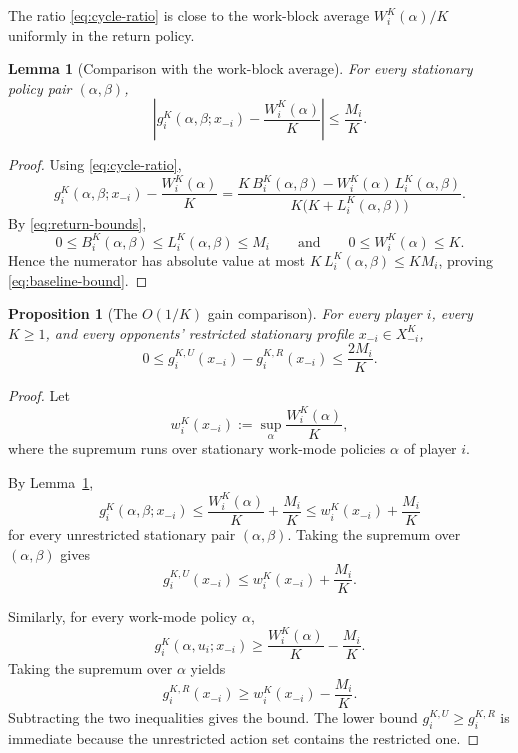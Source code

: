 \documentclass[11pt]{article}
\newtheorem{proposition}[theorem]{Proposition}
\newtheorem{lemma}[theorem]{Lemma}
\theoremstyle{definition}
\newcommand{\1}{\mathbf{1}}
\begin{document}
The ratio \eqref{eq:cycle-ratio} is close to the work-block average $W_i^K(\alpha)/K$ uniformly in the return policy.

\begin{lemma}[Comparison with the work-block average]\label{lem:work-baseline}
For every stationary policy pair $(\alpha,\beta)$,
\begin{equation}\label{eq:baseline-bound}
\left|
g_i^K(\alpha,\beta;x_{-i})-\frac{W_i^K(\alpha)}{K}
\right|
\le \frac{M_i}{K}.
\end{equation}
\end{lemma}

\begin{proof}
Using \eqref{eq:cycle-ratio},
\[
g_i^K(\alpha,\beta;x_{-i})-\frac{W_i^K(\alpha)}{K}
=
\frac{K\,B_i^K(\alpha,\beta)-W_i^K(\alpha)\,L_i^K(\alpha,\beta)}
{K\bigl(K+L_i^K(\alpha,\beta)\bigr)}.
\]
By \eqref{eq:return-bounds},
\[
0\le B_i^K(\alpha,\beta)\le L_i^K(\alpha,\beta)\le M_i
\qquad\text{and}\qquad
0\le W_i^K(\alpha)\le K.
\]
Hence the numerator has absolute value at most $K\,L_i^K(\alpha,\beta)\le KM_i$, proving \eqref{eq:baseline-bound}.
\end{proof}

\begin{proposition}[The $O(1/K)$ gain comparison]\label{prop:gain-comparison}
For every player $i$, every $K\ge1$, and every opponents' restricted stationary profile $x_{-i}\in X_{-i}^K$,
\[
0\le g_i^{K,U}(x_{-i})-g_i^{K,R}(x_{-i})\le \frac{2M_i}{K}.
\]
\end{proposition}

\begin{proof}
Let
\[
w_i^K(x_{-i}):=\sup_{\alpha}\frac{W_i^K(\alpha)}{K},
\]
where the supremum runs over stationary work-mode policies $\alpha$ of player $i$.

By Lemma~\ref{lem:work-baseline},
\[
g_i^K(\alpha,\beta;x_{-i})\le \frac{W_i^K(\alpha)}{K}+\frac{M_i}{K}\le w_i^K(x_{-i})+\frac{M_i}{K}
\]
for every unrestricted stationary pair $(\alpha,\beta)$. Taking the supremum over $(\alpha,\beta)$ gives
\[
g_i^{K,U}(x_{-i})\le w_i^K(x_{-i})+\frac{M_i}{K}.
\]

Similarly, for every work-mode policy $\alpha$,
\[
g_i^K(\alpha,u_i;x_{-i})\ge \frac{W_i^K(\alpha)}{K}-\frac{M_i}{K}.
\]
Taking the supremum over $\alpha$ yields
\[
g_i^{K,R}(x_{-i})\ge w_i^K(x_{-i})-\frac{M_i}{K}.
\]
Subtracting the two inequalities gives the bound. The lower bound $g_i^{K,U}\ge g_i^{K,R}$ is immediate because the unrestricted action set contains the restricted one.
\end{proof}
\end{document}
